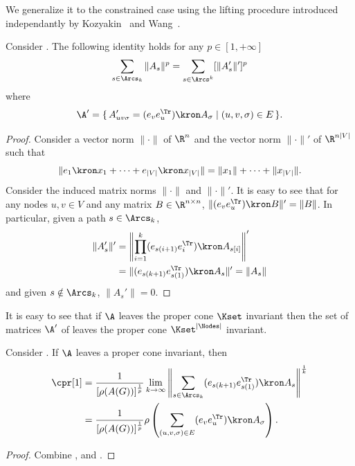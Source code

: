 We generalize it to the constrained case using the lifting procedure
introduced independantly by Kozyakin~\cite{kozyakin2014berger} and Wang~\cite{wang2014stability}.

\begin{lemma}
  \label{lem:koz}
  Consider .
  The following identity holds for any $p \in [1, +\infty]$
  \[
    \sum_{s \in \Arcs_k} \|A_s\|^p =
    \sum_{s \in \Arcs^k} [\|A_s'\|']^p
  \]
  where
  \[ \A' = \{\, A'_{uv\sigma} = (e_ve_u^\Tr) \kron A_\sigma \mid (u,v,\sigma) \in E \,\}. \]
  \begin{proof}
    Consider a vector norm $\|\cdot\|$ of $\R^n$ and
    the vector norm $\|\cdot\|'$ of $\R^{n|V|}$ such that
    \[ \|e_1 \kron x_1 + \cdots + e_{|V|} \kron x_{|V|}\| = \|x_1\| + \cdots + \|x_{|V|}\|. \]
    Consider the induced matrix norms $\|\cdot\|$ and $\|\cdot\|'$.
    It is easy to see that for any nodes $u,v \in V$ and any matrix $B \in \R^{n \times n}$,
    $\|(e_ve_u^\Tr) \kron B\|' = \|B\|$.
    In particular, given a path $s \in \Arcs_k$,
    \begin{align*}
      \|A_s'\|' & = \left\|\prod_{i=1}^k(e_{s(i+1)}e_i^\Tr) \kron A_{s[i]}\right\|'\\
      & = \|(e_{s(k+1)}e_{s(1)}^\Tr) \kron A_s\|' = \|A_s\|
    \end{align*}
    and given $s \notin \Arcs_k$, $\|A_s'\| = 0$.
  \end{proof}
\end{lemma}

It is easy to see that if $\A$ leaves the proper cone $\Kset$ invariant then
the set of matrices $\A'$ of  leaves the proper cone $\Kset^{|\Nodes|}$ invariant.

\begin{lemma}
  \label{lem:constrainedinv}
  Consider .
  If $\A$ leaves a proper cone invariant, then
  \begin{align*}
    \cpr[1]
    & = \frac{1}{[\rho(A(G))]^{\frac{1}{p}}}\lim_{k\to\infty} \left\|\sum_{s \in \Arcs_k}(e_{s(k+1)}e_{s(1)}^\Tr) \kron A_s\right\|^{\frac{1}{k}}\\
    & = \frac{1}{[\rho(A(G))]^{\frac{1}{p}}}\rho\left(\sum_{(u,v,\sigma) \in E}(e_ve_u^\Tr) \kron A_\sigma\right).
  \end{align*}
  \begin{proof}
    Combine ,  and .
  \end{proof}
\end{lemma}

